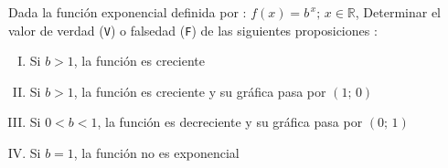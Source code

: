 \documentclass{article}
\begin{document}
\noindent Dada la función exponencial definida por : $f(x) = b^{\,x};\,x \in \mathbb{R}$, Determinar el valor de verdad ({\tt V}) o falsedad ({\tt F}) de las siguientes proposiciones :

\begin{enumerate}[I.]
\item{Si $b > 1$, la función es creciente}
\item{Si $b > 1$, la función es creciente y su gráfica pasa por $(1;\,0)$}
\item{Si $0 < b < 1$, la función es decreciente y su gráfica pasa por $(0;\,1)$}
\item{Si $b = 1$, la función no es exponencial}
\end{enumerate}
\end{document}
